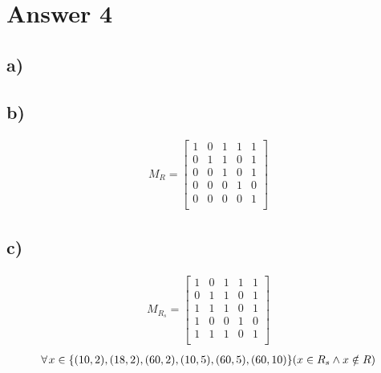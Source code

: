 \documentclass[12pt]{article}
\newcommand{\+}{\mkern2mu}
\begin{document}
\section*{Answer 4}

\subsection*{a) }
\begin{center}
\end{center}

\subsection*{b) }
\begin{gather*}
M_R = 
\begin{bmatrix}
1 & 0 & 1 & 1 & 1 \\
0 & 1 & 1 & 0 & 1 \\
0 & 0 & 1 & 0 & 1 \\
0 & 0 & 0 & 1 & 0 \\
0 & 0 & 0 & 0 & 1 \\
\end{bmatrix}
\end{gather*}

\subsection*{c) }
\begin{gather*}
M_{R_s} = 
\begin{bmatrix}
1 & 0 & 1 & 1 & 1 \\
0 & 1 & 1 & 0 & 1 \\
1 & 1 & 1 & 0 & 1 \\
1 & 0 & 0 & 1 & 0 \\
1 & 1 & 1 & 0 & 1 \\
\end{bmatrix}
\end{gather*}
\begin{gather*}
\forall \+ x \in \{(10, 2), (18, 2), (60, 2), (10, 5), (60, 5), (60, 10)\} (x \in R_s \land x \notin R)
\end{gather*}
\end{document}
